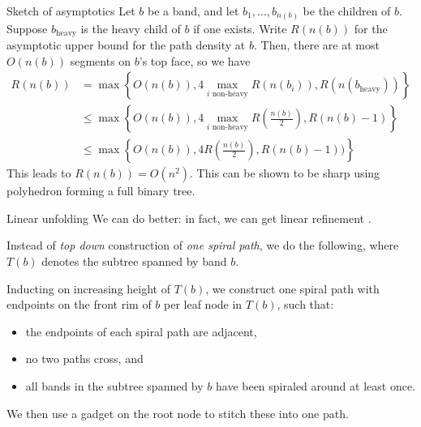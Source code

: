 \documentclass[handout]{beamer}
\theoremstyle{plain}
\begin{document}
\begin{frame}{Sketch of asymptotics}
  Let $b$ be a band, and let $b_1,\dots,b_{n(b)}$ be the children of $b$.
  Suppose $b_{\text{heavy}}$ is the heavy child of $b$ if one exists.
  Write $R(n(b))$ for the asymptotic upper bound for the path density at $b$.
  Then, there are at most $O(n(b))$ segments on $b$'s top face, so we have
  \begin{align*}
    R(n(b)) 
    &= \max \left\{ O(n(b)), 4 \max_{i \text{ non-heavy}} R(n(b_i)), R(n(b_{\text{heavy}}))\right\}\\
    &\leq \max \left\{ O(n(b)), 4 \max_{i \text{ non-heavy}} R\left( \frac{n(b)}{2} \right), R(n(b) - 1)\right\}\\
    &\leq \max \left\{ O(n(b)), 4 R\left( \frac{n(b)}{2} \right), R(n(b) - 1))\right\}
  \end{align*}
  This leads to $R(n(b)) = O(n^2)$.
  This can be shown to be sharp using polyhedron forming a full binary tree.
\end{frame}
  
\begin{frame}{Linear unfolding}
  We can do better:
  in fact, we can get linear refinement .

  Instead of \emph{top down} construction of \emph{one spiral path}, we do the following, where $T(b)$ denotes the subtree spanned by band $b$.

  Inducting on increasing height of $T(b)$, we construct one spiral path with endpoints on the front rim of $b$ per leaf node in $T(b)$, such that:
    \begin{itemize}
      \item the endpoints of each spiral path are adjacent,
      \item no two paths cross, and
      \item all bands in the subtree spanned by $b$ have been spiraled around at least once.
    \end{itemize}
  We then use a gadget on the root node to stitch these into one path.
\end{frame}
\end{document}
